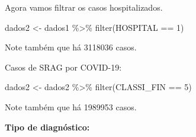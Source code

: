 \documentclass[
]{article}
\newenvironment{Shaded}{\begin{snugshade}}{\end{snugshade}}
\newcommand{\DecValTok}[1]{\textcolor[rgb]{0.00,0.00,0.81}{#1}}
\newcommand{\FunctionTok}[1]{\textcolor[rgb]{0.00,0.00,0.00}{#1}}
\newcommand{\NormalTok}[1]{#1}
\newcommand{\OtherTok}[1]{\textcolor[rgb]{0.56,0.35,0.01}{#1}}
\newcommand{\SpecialCharTok}[1]{\textcolor[rgb]{0.00,0.00,0.00}{#1}}
\begin{document}
Agora vamos filtrar os casos hospitalizados.

\begin{Shaded}
\begin{Highlighting}[]
\NormalTok{dados2 }\OtherTok{\textless{}{-}}\NormalTok{ dados1 }\SpecialCharTok{\%\textgreater{}\%} 
  \FunctionTok{filter}\NormalTok{(HOSPITAL }\SpecialCharTok{==} \DecValTok{1}\NormalTok{)}
\end{Highlighting}
\end{Shaded}

Note também que há 3118036 casos.

Casos de SRAG por COVID-19:

\begin{Shaded}
\begin{Highlighting}[]
\NormalTok{dados2 }\OtherTok{\textless{}{-}}\NormalTok{ dados2 }\SpecialCharTok{\%\textgreater{}\%} 
  \FunctionTok{filter}\NormalTok{(CLASSI\_FIN }\SpecialCharTok{==} \DecValTok{5}\NormalTok{)}
\end{Highlighting}
\end{Shaded}

Note também que há 1989953 casos.

\textbf{Tipo de diagnóstico:}
\end{document}
